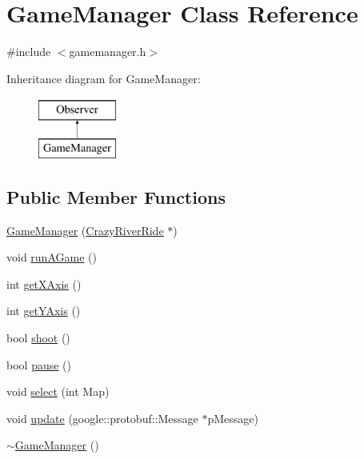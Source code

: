\hypertarget{class_game_manager}{\section{Game\-Manager Class Reference}
\label{class_game_manager}
}


{\ttfamily \#include $<$gamemanager.\-h$>$}

Inheritance diagram for Game\-Manager\-:\begin{figure}[H]
\begin{center}
\leavevmode
\includegraphics[height=2.000000cm]{class_game_manager}
\end{center}
\end{figure}
\subsection*{Public Member Functions}
\begin{DoxyCompactItemize}
\item 
\hyperlink{class_game_manager_a8ca3e8bfd80b9c5637a279ba0a779859}{Game\-Manager} (\hyperlink{class_crazy_river_ride}{Crazy\-River\-Ride} $\ast$)
\item 
void \hyperlink{class_game_manager_a46f13cda874d5146c65db959d44607c8}{run\-A\-Game} ()
\item 
int \hyperlink{class_game_manager_a24ac94e016dc0ad440faa7b88ee31840}{get\-X\-Axis} ()
\item 
int \hyperlink{class_game_manager_abe4ae648e6067c8bd19a1d020c292560}{get\-Y\-Axis} ()
\item 
bool \hyperlink{class_game_manager_a6b43e9e166a906789e4b4aa134218994}{shoot} ()
\item 
bool \hyperlink{class_game_manager_a91a7e823176e56f32ca0b582592d7b02}{pause} ()
\item 
void \hyperlink{class_game_manager_a0c03dfd4e0fd50e0d9159da2b3d15342}{select} (int Map)
\item 
void \hyperlink{class_game_manager_abcc7beda88f37957ab1c0711de030a45}{update} (google\-::protobuf\-::\-Message $\ast$p\-Message)
\item 
\hyperlink{class_game_manager_aaae63e38e358379c1fe507c5197a8435}{$\sim$\-Game\-Manager} ()
\end{DoxyCompactItemize}


